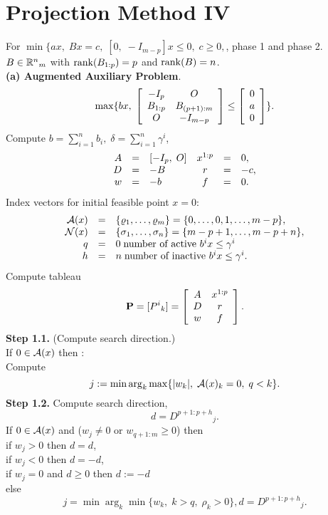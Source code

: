 \section{Projection Method IV}
For $\min \{ax, \; Bx = c, \; [0, \; -I_{m-p}]x \leq 0,
\; c \geq 0,$, phase 1 and phase 2.\\
$B \in \Bbb{R}^n{}_m$ with $\rank (B_{1:p}) = p$ and
$\rank (B) = n$.\\
{\bf (a) Augmented Auxiliary Problem}.
%
\[
\max\{bx, \; \ba{[}{cc} -I_p & O\\ B_{1:p} & B_{(p+1):m}\\O  &
-I_{m-p} \ea{]} \leq \ba{[}{c}0 \\ a \\ 0 \ea{]}\}.
\]
Compute  $b = \sum_{i=1}^nb_i, \;  \delta  = \sum_{i=1}^n\gamma^i$,
\[ \ba{.}{rclcrl}
A &=& [-I_p, \; O]          &     x^{1:p} &=& 0,\\
D &=&  - B                  &     r       &=& - c,        \\
w &=&  - b                  &     f       &=& 0.
\ea{.}
\]
Index vectors for initial feasible point $x = 0$:
\[ \ba{.} {rclcl}
\A(x) &=&  \{\rho _1,\ldots,\rho _m\} = \{0, \ldots ,0,1,\ldots ,m-p\},\\
\N(x) &=&  \{\sigma _1, \ldots,\sigma _n\} = \{m-p+1, \ldots, m-p+n\},\\
  q   &=&  0 \; \mbox{number of active $b^ix \leq \gamma ^i$}\\
  h   &=&  n \; \mbox{number of inactive $b^ix \leq \gamma ^i$}.
\ea{.}
\]
Compute tableau
\[
{\bf P} = [P^i{}_k] = \ba{[}{cc} A & x^{1:p}\\ D & r\\ w & f\ea{]}.
\]
{\bf Step 1.1.} (Compute search direction.)\\
If $0 \in \A(x)$ then :\\
Compute
\[
j := \min \arg_k \max \{|w_k|, \; \A(x)_k = 0, \; q < k\}.
\]
{\bf Step 1.2.} Compute search direction,
\[
d = D^{p+1:p+h}{}_j.
\]
If $0 \in \A(x)$ and ($w_j \neq 0$ or $w_{q+1:m} \geq 0$) then\\
\hspace*{1cm} if $w_j > 0$ then $d = d$,\\
\hspace*{1cm} if $w_j < 0$ then $d = - d$,\\
\hspace*{1cm} if $w_j = 0$ and $d \geq 0$ then $d := -d$\\
else
\[
j = \min \arg_k \min \{w_k, \; k > q, \; \rho _k > 0\},
d = D^{p+1:p+h}{}_j.
\]
